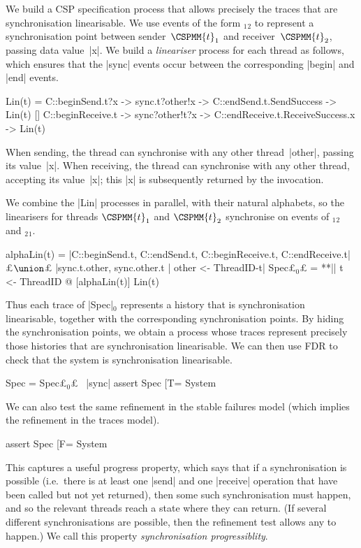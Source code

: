 We build a CSP specification process that allows precisely the traces that are
synchronisation linearisable.  We use events of the form
$_1$$_2$ to represent a synchronisation point
between sender~$\CSPMM{t}_1$ and receiver~$\CSPMM{t}_2$, passing data
value~|x|.  We build a \emph{lineariser} process for each thread as follows,
which ensures that the |sync| events occur between the corresponding |begin|
and |end| events.
%
\begin{cspm}
Lin(t) = 
  C::beginSend.t?x -> sync.t?other!x -> C::endSend.t.SendSuccess -> Lin(t)
  [] C::beginReceive.t -> sync?other!t?x -> C::endReceive.t.ReceiveSuccess.x -> Lin(t)
\end{cspm}
%
When sending, the thread can synchronise with any other thread~|other|,
passing its value~|x|.  When receiving, the thread can synchronise with any
other thread, accepting its value~|x|; this |x| is subsequently returned by
the invocation.

We combine the |Lin| processes in parallel, with their natural
alphabets, so the linearisers for threads $\CSPMM{t}_1$ and $\CSPMM{t}_2$
synchronise on events of $_1$$_2$ and
$_2$$_1$.  
%
\begin{cspm}
alphaLin(t) =
  {|C::beginSend.t, C::endSend.t, C::beginReceive.t, C::endReceive.t|} £$\union$£
  {|sync.t.other, sync.other.t | other <- ThreadID-{t}|}
Spec£$_0$£ = **|| t <- ThreadID @ [alphaLin(t)] Lin(t)
\end{cspm} %
%
Thus each trace of |Spec|$_0$ represents a history that is synchronisation
linearisable, together with the corresponding synchronisation points.  By
hiding the synchronisation points, we obtain a process whose traces represent
precisely those histories that are synchronisation linearisable.  We can then
use FDR to check that the system is synchronisation linearisable. 
%
\begin{cspm}
Spec = Spec£$_0$£ \ {|sync|}
assert Spec [T= System
\end{cspm}

We can also test the same refinement in the stable failures model (which
implies the refinement in the traces model).
%
\begin{cspm}
assert Spec [F= System
\end{cspm}
%
This captures a useful progress property, which says that if a synchronisation
is possible (i.e.~there is at least one |send| and one |receive| operation
that have been called but not yet returned), then some such synchronisation
must happen, and so the relevant threads reach a state where they can return.  
(If several different synchronisations are possible, then the refinement test
allows any to happen.)  We call this property \emph{synchronisation
  progressiblity}. 

